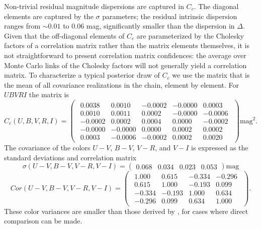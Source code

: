 \documentclass{aastex61}   	%
\begin{document}
Non-trivial residual magnitude dispersions are captured in $C_c$.  The diagonal elements are captured by the $\sigma$ parameters;
the residual intrinsic dispersion ranges from
$\sim 0.01$ to 0.06 mag, significantly smaller
than the dispersion in $\Delta$.  Given that the 
off-diagonal elements of $C_c$ are parameterized by the Cholesky factors of a correlation matrix rather than the matrix elements themselves,
it is not straightforward to present correlation matrix confidences:
the average over Monte Carlo links of the
Cholesky factors will not  generally yield a correlation matrix.  
To characterize a typical posterior draw of $C_c$ we use the matrix that is the mean of all covariance realizations in the
chain, element by element.
For $UBVRI$ the matrix is
\begin{equation}
C_c(U,B,V,R,I)=
\begin{pmatrix}
\begin{array}{rrrrr}
0.0038 & 0.0010 & -0.0002 & -0.0000 & 0.0003 \\
0.0010 & 0.0011 & 0.0002 & -0.0000 & -0.0006 \\
-0.0002 & 0.0002 & 0.0004 & 0.0000 & -0.0002 \\
-0.0000 & -0.0000 & 0.0000 & 0.0002 & 0.0002 \\
0.0003 & -0.0006 & -0.0002 & 0.0002 & 0.0020
\end{array}
 \end{pmatrix} \text{mag}^2.
 \label{mag_cov:eqn}
 \end{equation}
The  covariance of the colors $U-V$, $B-V$, $V-R$, and $V-I$ is
expressed as the standard deviations and
 correlation matrix
 \begin{equation}
 \sigma(U-V, B-V, V-R, V-I)=
 \begin{pmatrix}
0.068 & 0.034& 0.023 & 0.053
  \end{pmatrix} \text{mag}
 \label{color_sd:eqn}
   \end{equation}
 \begin{equation}
 Cor(U-V, B-V, V-R, V-I)=
\begin{pmatrix}
\begin{array}{rrrr}
1.000 & 0.615 & -0.334 & -0.296 \\
0.615 & 1.000 & -0.193 & 0.099 \\
-0.334 & -0.193 & 1.000 & 0.634 \\
-0.296 & 0.099 & 0.634 & 1.000 
\end{array}
\end{pmatrix}.
  \label{color_cor:eqn}
 \end{equation}
These color variances are smaller than those derived by \citet{2003A&A...404..901N, 2007ApJ...659..122J}, for cases where direct comparison can be made.
\end{document}
